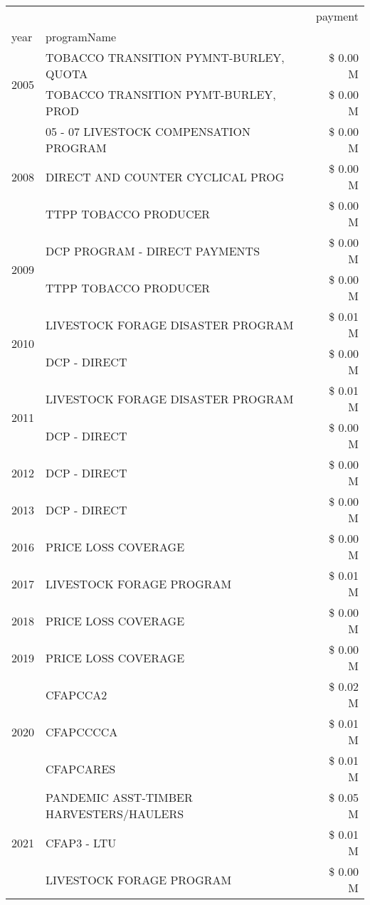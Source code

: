\begin{tabular}{llr}
\toprule
 &  & payment \\
year & programName &  \\
\midrule
\multirow[t]{2}{*}{2005} & TOBACCO TRANSITION PYMNT-BURLEY, QUOTA & \$ 0.00 M \\
 & TOBACCO TRANSITION PYMT-BURLEY, PROD & \$ 0.00 M \\
\cline{1-3}
\multirow[t]{3}{*}{2008} & 05 - 07 LIVESTOCK COMPENSATION PROGRAM & \$ 0.00 M \\
 & DIRECT AND COUNTER CYCLICAL PROG & \$ 0.00 M \\
 & TTPP TOBACCO PRODUCER & \$ 0.00 M \\
\cline{1-3}
\multirow[t]{2}{*}{2009} & DCP PROGRAM - DIRECT PAYMENTS & \$ 0.00 M \\
 & TTPP TOBACCO PRODUCER & \$ 0.00 M \\
\cline{1-3}
\multirow[t]{2}{*}{2010} & LIVESTOCK FORAGE DISASTER PROGRAM & \$ 0.01 M \\
 & DCP - DIRECT & \$ 0.00 M \\
\cline{1-3}
\multirow[t]{2}{*}{2011} & LIVESTOCK FORAGE DISASTER PROGRAM & \$ 0.01 M \\
 & DCP - DIRECT & \$ 0.00 M \\
\cline{1-3}
2012 & DCP - DIRECT & \$ 0.00 M \\
\cline{1-3}
2013 & DCP - DIRECT & \$ 0.00 M \\
\cline{1-3}
2016 & PRICE LOSS COVERAGE & \$ 0.00 M \\
\cline{1-3}
2017 & LIVESTOCK FORAGE PROGRAM & \$ 0.01 M \\
\cline{1-3}
2018 & PRICE LOSS COVERAGE & \$ 0.00 M \\
\cline{1-3}
2019 & PRICE LOSS COVERAGE & \$ 0.00 M \\
\cline{1-3}
\multirow[t]{3}{*}{2020} & CFAPCCA2 & \$ 0.02 M \\
 & CFAPCCCCA & \$ 0.01 M \\
 & CFAPCARES & \$ 0.01 M \\
\cline{1-3}
\multirow[t]{3}{*}{2021} & PANDEMIC ASST-TIMBER HARVESTERS/HAULERS & \$ 0.05 M \\
 & CFAP3 - LTU & \$ 0.01 M \\
 & LIVESTOCK FORAGE PROGRAM & \$ 0.00 M \\
\cline{1-3}
\bottomrule
\end{tabular}
